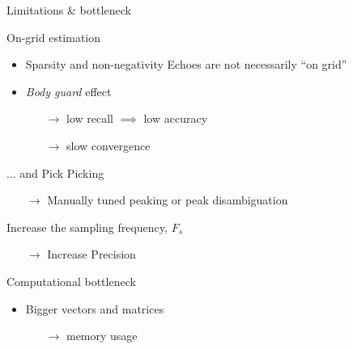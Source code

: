 \begin{frame}{Limitations \& bottleneck}

    \begin{block}{On-grid estimation}
        \begin{itemize}
        \item Sparsity and non-negativity Echoes are not necessarily ``on grid''

        \item \emph{Body guard} effect \cite{duval2013}

        \begin{itemize}
            \item[$\rightarrow$] low recall $\implies$ low accuracy %
            \item[$\rightarrow$] slow convergence %
        \end{itemize}
        \end{itemize}
    \end{block}

    \begin{block}{... and Pick Picking}
        \begin{itemize}
            \item[$\rightarrow$] Manually tuned peaking or peak disambiguation
        \end{itemize}
    \end{block}

    \vfill

    \begin{block}{Increase the sampling frequency, $F_s$}
        \begin{itemize}
            \item[$\rightarrow$] Increase Precision
        \end{itemize}
    \end{block}

    \begin{block}{Computational bottleneck}
    \begin{itemize}

        \item Bigger vectors and matrices
        \begin{itemize}
            \item[$\longrightarrow$] memory usage
        \end{itemize}


\end{itemize}
\end{block}
\end{frame}
